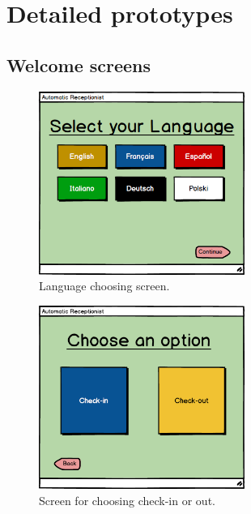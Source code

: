 \documentclass{article}
\begin{document}
\section{Detailed prototypes}

\subsection{Welcome screens}
\begin{figure}[H]
\centering
\includegraphics[width=0.6\textwidth]{Images/Base_1_Languages.png}
\caption{Language choosing screen.}
\label{figLanguages}
\end{figure}

\begin{figure}[H]
\centering
\includegraphics[width=0.6\textwidth]{Images/Basic_2_option.png}
\caption{Screen for choosing check-in or out.}
\label{figCheckInOut}
\end{figure}
\end{document}
